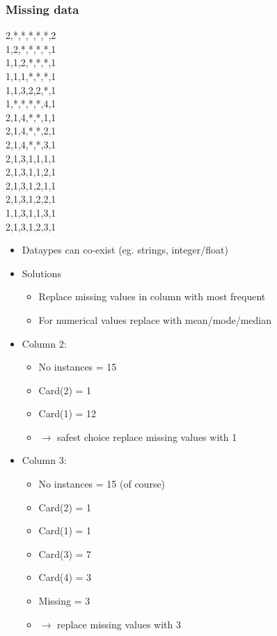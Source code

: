 \documentclass{beamer}
\begin{document}
\begin{frame}[allowframebreaks]
\frametitle{Missing data}
\begin{center}

2,*,*,*,*,*,2\\
1,2,*,*,*,*,1\\
1,1,2,*,*,*,1\\
1,1,1,*,*,*,1\\
1,1,3,2,2,*,1\\
1,*,*,*,*,4,1\\
2,1,4,*,*,1,1\\
2,1,4,*,*,2,1\\
2,1,4,*,*,3,1\\
2,1,3,1,1,1,1\\
2,1,3,1,1,2,1\\
2,1,3,1,2,1,1\\
2,1,3,1,2,2,1\\
1,1,3,1,1,3,1\\
2,1,3,1,2,3,1
\end{center}

\begin{itemize}
\item Dataypes can co-exist (eg. strings, integer/float)
\vfill
\item Solutions
\begin{itemize}
\item Replace missing values in column with most frequent
\item For numerical values replace with mean/mode/median
\end{itemize}
\item Column 2:
\begin{itemize}
\item No instances = 15
\item Card(2) = 1
\item Card(1) = 12
\item $\rightarrow$ safest choice replace missing values with 1 
\end{itemize}
\item Column 3:
\begin{itemize}
\item No instances = 15 (of course)
\item Card(2) = 1 
\item Card(1) = 1
\item Card(3) = 7
\item Card(4) = 3
\item Missing = 3
\item $\rightarrow$ replace missing values with 3
\end{itemize}



\end{itemize}


\end{frame}
\end{document}
